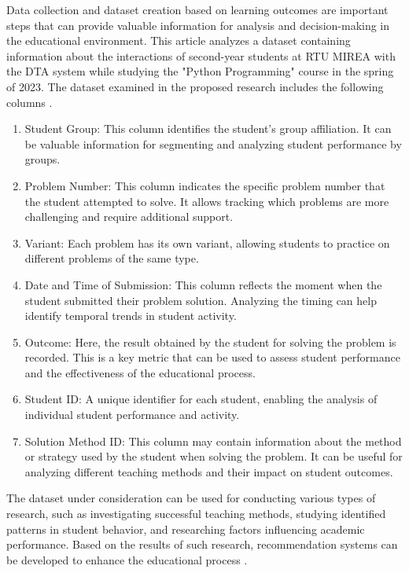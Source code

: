 \documentclass{article}
\begin{document}
\begin{multicols}{2}
\begin{justify}
      Data collection and dataset creation based on learning outcomes are important steps that can provide valuable information for analysis and decision-making in the educational environment. This article analyzes a dataset containing information about the interactions of second-year students at RTU MIREA with the DTA system while studying the "Python Programming" course in the spring of 2023. The dataset examined in the proposed research includes the following columns \cite{11}.

      \begin{enumerate}
        \item Student Group: This column identifies the student's group affiliation. It can be valuable information for segmenting and analyzing student performance by groups.
        \item Problem Number: This column indicates the specific problem number that the student attempted to solve. It allows tracking which problems are more challenging and require additional support.
        \item Variant: Each problem has its own variant, allowing students to practice on different problems of the same type.
        \item	Date and Time of Submission: This column reflects the moment when the student submitted their problem solution. Analyzing the timing can help identify temporal trends in student activity.
        \item	Outcome: Here, the result obtained by the student for solving the problem is recorded. This is a key metric that can be used to assess student performance and the effectiveness of the educational process.
        \item	Student ID: A unique identifier for each student, enabling the analysis of individual student performance and activity.
        \item	Solution Method ID: This column may contain information about the method or strategy used by the student when solving the problem. It can be useful for analyzing different teaching methods and their impact on student outcomes.
      \end{enumerate}

      The dataset under consideration can be used for conducting various types of research, such as investigating successful teaching methods, studying identified patterns in student behavior, and researching factors influencing academic performance. Based on the results of such research, recommendation systems can be developed to enhance the educational process \cite{12}.


\end{justify}
\end{multicols}
\end{document}
